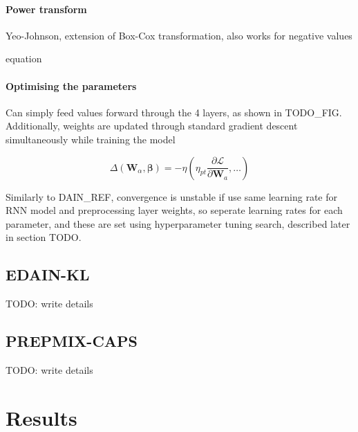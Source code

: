\documentclass{statsmsc}
\begin{document}
\subsubsection{Power transform}%
\label{ssub:Power transform}


Yeo-Johnson, extension of Box-Cox transformation, also works for negative values

equation


\subsubsection{Optimising the parameters}%
\label{ssub:Optimising the parameters}

Can simply feed values forward through the 4 layers, as shown in TODO\_FIG.
Additionally, weights are updated through standard gradient descent simultaneously while
training the model

\begin{equation}
    \Delta (\mathbf{W}_\alpha,\mathbf{\beta})=-\eta\left( \eta_{pt} \frac{\partial \mathcal{L}}{\partial \mathbf{W}_a},\dots  \right)
\end{equation}

Similarly to DAIN\_REF, convergence is unstable if use same learning rate for RNN model and
preprocessing layer weights, so seperate learning rates for each parameter, and these are
set using hyperparameter tuning search, described later in section TODO.


\section{EDAIN-KL}%
\label{sec:EDAIN-KL}

TODO: write details


\section{PREPMIX-CAPS}%
\label{sec:PREPMIX-CAPS}

TODO: write details


\chapter{Results} %
\end{document}
